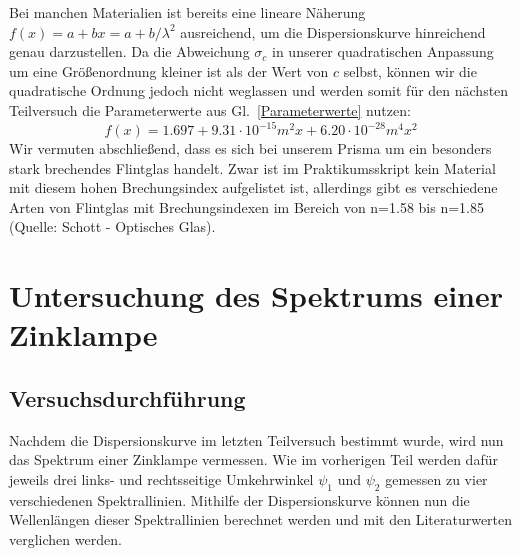 \documentclass[12pt,a4paper]{article}
\begin{document}
Bei manchen Materialien ist bereits eine lineare Näherung $f(x)=a+bx=a+b/\lambda^2$ ausreichend, um die Dispersionskurve hinreichend genau darzustellen. Da die Abweichung $\sigma_c$ in unserer quadratischen Anpassung um eine Größenordnung kleiner ist als der Wert von $c$ selbst, können wir die quadratische Ordnung jedoch nicht weglassen und werden somit für den nächsten Teilversuch die Parameterwerte aus Gl.~\eqref{Parameterwerte} nutzen:
\begin{equation}\label{eq:fitfunction}
f(x)=1.697+9.31\cdot10^{-15}m^2x+6.20\cdot10^{-28}m^4x^2
\end{equation}
Wir vermuten abschließend, dass es sich bei unserem Prisma um ein besonders stark brechendes Flintglas handelt. Zwar ist im Praktikumsskript kein Material mit diesem hohen Brechungsindex aufgelistet ist, allerdings gibt es verschiedene Arten von Flintglas mit Brechungsindexen im Bereich von n=1.58 bis n=1.85 (Quelle: Schott - Optisches Glas).\\

\FloatBarrier
\section{Untersuchung des Spektrums einer Zinklampe}
\subsection{Versuchsdurchführung}
Nachdem die Dispersionskurve im letzten Teilversuch bestimmt wurde, wird nun das Spektrum einer Zinklampe vermessen. Wie im vorherigen Teil werden dafür jeweils drei links- und rechtsseitige Umkehrwinkel $\psi_1$ und $\psi_2$ gemessen zu vier verschiedenen Spektrallinien. Mithilfe der Dispersionskurve können nun die Wellenlängen dieser Spektrallinien berechnet werden und mit den Literaturwerten verglichen werden.
\end{document}
